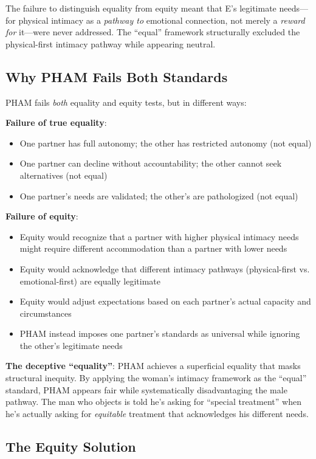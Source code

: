 \documentclass[12pt,openany]{book}
\numberwithin{equation}{chapter}
\begin{document}
The failure to distinguish equality from equity meant that E's legitimate needs---for physical intimacy as a \textit{pathway to} emotional connection, not merely a \textit{reward for} it---were never addressed. The ``equal'' framework structurally excluded the physical-first intimacy pathway while appearing neutral.

\subsection{Why PHAM Fails Both Standards}

PHAM fails \textit{both} equality and equity tests, but in different ways:

\textbf{Failure of true equality}:
\begin{itemize}
    \item One partner has full autonomy; the other has restricted autonomy (not equal)
    \item One partner can decline without accountability; the other cannot seek alternatives (not equal)
    \item One partner's needs are validated; the other's are pathologized (not equal)
\end{itemize}

\textbf{Failure of equity}:
\begin{itemize}
    \item Equity would recognize that a partner with higher physical intimacy needs might require different accommodation than a partner with lower needs
    \item Equity would acknowledge that different intimacy pathways (physical-first vs. emotional-first) are equally legitimate
    \item Equity would adjust expectations based on each partner's actual capacity and circumstances
    \item PHAM instead imposes one partner's standards as universal while ignoring the other's legitimate needs
\end{itemize}

\textbf{The deceptive ``equality''}: PHAM achieves a superficial equality that masks structural inequity. By applying the woman's intimacy framework as the ``equal'' standard, PHAM appears fair while systematically disadvantaging the male pathway. The man who objects is told he's asking for ``special treatment'' when he's actually asking for \textit{equitable} treatment that acknowledges his different needs.

\subsection{The Equity Solution}
\end{document}

